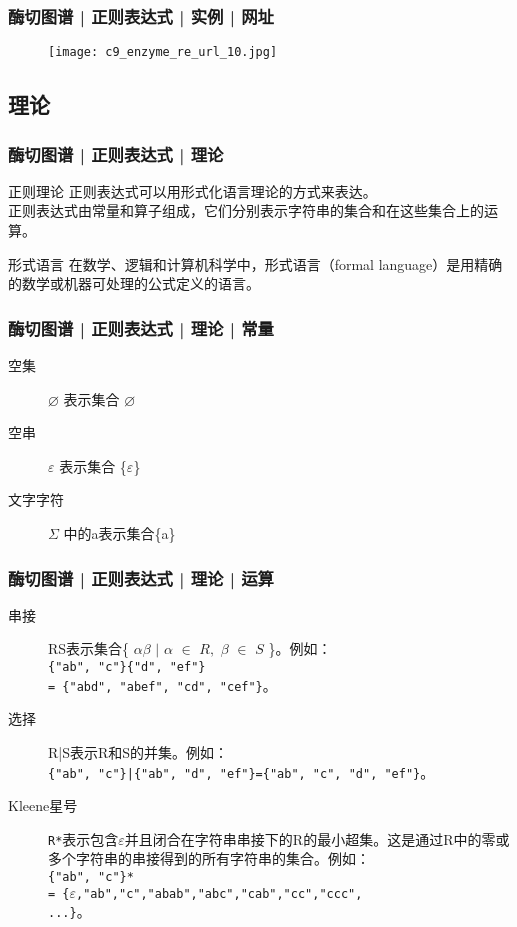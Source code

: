 \begin{frame}
  \frametitle{酶切图谱 | 正则表达式 | 实例 | 网址}
  \begin{figure}
    \centering
    \texttt{[image: c9\_enzyme\_re\_url\_10.jpg]}
  \end{figure}
\end{frame}

\subsection{理论}
\begin{frame}
  \frametitle{酶切图谱 | 正则表达式 | 理论}
  \begin{block}{正则理论}
    正则表达式可以用形式化语言理论的方式来表达。\\
    \vspace{1em}
    \alert{正则表达式由常量和算子组成，它们分别表示字符串的集合和在这些集合上的运算。}
  \end{block}
  \pause
  \begin{block}{形式语言}
    在数学、逻辑和计算机科学中，形式语言（formal language）是用精确的数学或机器可处理的公式定义的语言。
  \end{block}
\end{frame}

\begin{frame}
  \frametitle{酶切图谱 | 正则表达式 | 理论 | 常量}
  \begin{description}
    \item[空集] $\varnothing$ 表示集合 $\varnothing$
    \item[空串] $\varepsilon$ 表示集合 \{$\varepsilon$\}
    \item[文字字符] $\Sigma$ 中的a表示集合\{a\}
  \end{description}
\end{frame}

\begin{frame}[fragile]
  \frametitle{酶切图谱 | 正则表达式 | 理论 | 运算}
  \begin{description}
    \item[串接] RS表示集合\{ $\alpha\beta$ $|$ $\alpha$ $\in$  $R,$ $\beta$ $\in$ $S$ \}。例如：\\ \verb|{"ab", "c"}{"d", "ef"}| \\\verb|= {"abd", "abef", "cd", "cef"}|。
    \item[选择] R|S表示R和S的并集。例如：\\ \verb+{"ab", "c"}|{"ab", "d", "ef"}={"ab", "c", "d", "ef"}+。
    \item[Kleene星号] \verb|R*|表示包含$\varepsilon$并且闭合在字符串串接下的R的最小超集。这是通过R中的零或多个字符串的串接得到的所有字符串的集合。例如：\\ \verb|{"ab", "c"}*|\\ \verb|= {|$\varepsilon$\verb|,"ab","c","abab","abc","cab","cc","ccc",|\\ \quad \verb|...}|。
  \end{description}
\end{frame}

